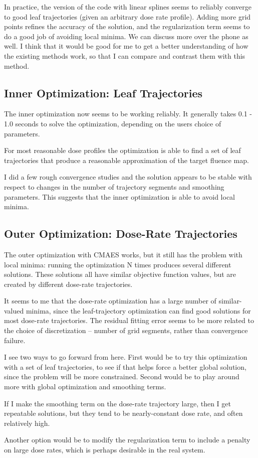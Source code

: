 In practice, the version of the code with linear splines seems to reliably converge to good leaf trajectories (given an arbitrary dose rate profile). Adding more grid points refines the accuracy of the solution, and the regularization term seems to do a good job of avoiding local minima. We can discuss more over the phone as well. I think that it would be good for me to get a better understanding of how the existing methods work, so that I can compare and contrast them with this method.

\subsection{Inner Optimization:  Leaf Trajectories}

The inner optimization now seems to be working reliably.
It generally takes 0.1 - 1.0 seconds to solve the optimization, depending on the users choice of parameters.

For most reasonable dose profiles the optimization is able to find a set of leaf trajectories
that produce a reasonable approximation of the target fluence map.

I did a few rough convergence studies and the solution appears to be stable with respect to changes
in the number of trajectory segments and smoothing parameters.
This suggests that the inner optimization is able to avoid local minima.



\subsection{Outer Optimization:  Dose-Rate Trajectories}

The outer optimization with CMAES works, but it still has the problem with local minima:
running the optimization N times produces several different solutions.
These solutions all have similar objective function values, but are created by different
dose-rate trajectories.

It seems to me that the dose-rate optimization has a large number of similar-valued minima,
since the leaf-trajectory optimization can find good solutions for most dose-rate trajectories.
The residual fitting error seems to be more related to the choice of discretization -- number of
grid segments, rather than convergence failure.

I see two ways to go forward from here. First would be to try this optimization with a set of
leaf trajectories, to see if that helps force a better global solution, since the problem will
be more constrained. Second would be to play around more with global optimization and smoothing
terms.

If I make the smoothing term on the dose-rate trajectory large, then I get repeatable solutions,
but they tend to be nearly-constant dose rate, and often relatively high.

Another option would be to modify the regularization term to include a  penalty on large
dose rates, which is perhaps desirable in the real system.

